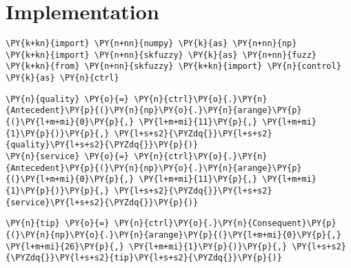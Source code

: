 \section{Implementation}
    \begin{tcolorbox}[breakable, size=fbox, boxrule=1pt, pad at break*=1mm,colback=cellbackground, colframe=cellborder]
\begin{Verbatim}[commandchars=\\\{\}]
\PY{k+kn}{import} \PY{n+nn}{numpy} \PY{k}{as} \PY{n+nn}{np}
\PY{k+kn}{import} \PY{n+nn}{skfuzzy} \PY{k}{as} \PY{n+nn}{fuzz}
\PY{k+kn}{from} \PY{n+nn}{skfuzzy} \PY{k+kn}{import} \PY{n}{control} \PY{k}{as} \PY{n}{ctrl}
\end{Verbatim}
\end{tcolorbox}

    \begin{tcolorbox}[breakable, size=fbox, boxrule=1pt, pad at break*=1mm,colback=cellbackground, colframe=cellborder]
\begin{Verbatim}[commandchars=\\\{\}]
\PY{n}{quality} \PY{o}{=} \PY{n}{ctrl}\PY{o}{.}\PY{n}{Antecedent}\PY{p}{(}\PY{n}{np}\PY{o}{.}\PY{n}{arange}\PY{p}{(}\PY{l+m+mi}{0}\PY{p}{,} \PY{l+m+mi}{11}\PY{p}{,} \PY{l+m+mi}{1}\PY{p}{)}\PY{p}{,} \PY{l+s+s2}{\PYZdq{}}\PY{l+s+s2}{quality}\PY{l+s+s2}{\PYZdq{}}\PY{p}{)}
\PY{n}{service} \PY{o}{=} \PY{n}{ctrl}\PY{o}{.}\PY{n}{Antecedent}\PY{p}{(}\PY{n}{np}\PY{o}{.}\PY{n}{arange}\PY{p}{(}\PY{l+m+mi}{0}\PY{p}{,} \PY{l+m+mi}{11}\PY{p}{,} \PY{l+m+mi}{1}\PY{p}{)}\PY{p}{,} \PY{l+s+s2}{\PYZdq{}}\PY{l+s+s2}{service}\PY{l+s+s2}{\PYZdq{}}\PY{p}{)}
\end{Verbatim}
\end{tcolorbox}

    \begin{tcolorbox}[breakable, size=fbox, boxrule=1pt, pad at break*=1mm,colback=cellbackground, colframe=cellborder]
\begin{Verbatim}[commandchars=\\\{\}]
\PY{n}{tip} \PY{o}{=} \PY{n}{ctrl}\PY{o}{.}\PY{n}{Consequent}\PY{p}{(}\PY{n}{np}\PY{o}{.}\PY{n}{arange}\PY{p}{(}\PY{l+m+mi}{0}\PY{p}{,} \PY{l+m+mi}{26}\PY{p}{,} \PY{l+m+mi}{1}\PY{p}{)}\PY{p}{,} \PY{l+s+s2}{\PYZdq{}}\PY{l+s+s2}{tip}\PY{l+s+s2}{\PYZdq{}}\PY{p}{)}
\end{Verbatim}
\end{tcolorbox}

